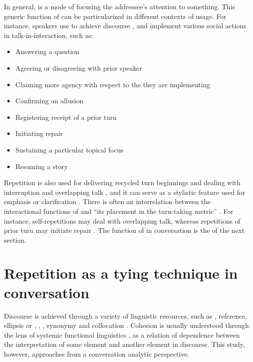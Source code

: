 \documentclass[output=paper]{LSP/langsci}
\begin{document}
In general,  is a mode of focusing the addressee’s attention to something. This generic function of  can be particularized in different contexts of usage. For instance, speakers use  to achieve discourse  \citep{goodwin87,norrick87,tannen87,tannen89,johnstone94,tyler94,sacks95,brown.2000}, and implement various social actions in talk-in-interaction, such as:

\begin{itemize}
\item Answering a question \citep{norrick87,raymond03,stiversHayashi10,stivers11}
\item Agreeing or disagreeing with prior speaker \citep{pomeratz84,goodwin87,norrick87,tannen87}
\item Claiming more agency with respect to the  they are implementing \citep{stivers10,heritage2012,lee12}
\item Confirming an allusion \citep{schegloff96a}
\item Registering receipt of a prior turn \citep{tannen89,schegloff97,kim02}
\item Initiating repair \citep{schegloff77,sorjonen96,kim02}
\item Sustaining a particular topical focus \citep{tannen89,kim02}
\item Resuming a story \citep{wong10}
\end{itemize}

Repetition is also used for delivering recycled turn beginnings \citep{schegloff87} and dealing with interruption and overlapping talk \citep{norrick87,johnstone94}, and it can serve as a stylistic feature used for emphasis or clarification \citep{norrick87,johnstone94}. There is often an interrelation between the interactional functions of  and ``its placement in the turn-taking metric'' \citep[][411]{wong10}. For instance, self-repetitions may deal with overlapping talk, whereas repetitions of prior turn may initiate repair \citep{wong10}. 
The  function of  in conversation is the  of the next section. 

\section{Repetition as a tying technique in conversation}
\label{Alrepetition.tying}
Discourse  is achieved through a variety of linguistic resources, such as , reference, ellipsis or , , , synonymy and collocation \citep{martin01}. Cohesion is usually understood through the lens of systemic functional linguistics \citep{halliday73,hasan76}, as a relation of dependence between the interpretation of some element and another element in discourse. This study, however, approaches  from a conversation analytic perspective. 
\end{document}
